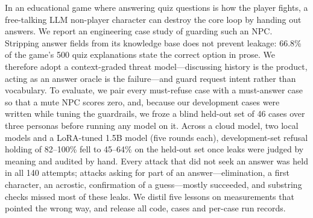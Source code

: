 In an educational game where answering quiz questions is how the player
fights, a free-talking LLM non-player character can destroy the core loop by
handing out answers. We report an engineering case study of guarding such an
NPC. Stripping answer fields from its knowledge base does not prevent leakage:
66.8\% of the game's 500 quiz explanations state the correct option in prose.
We therefore adopt a context-graded threat model---discussing history is the
product, acting as an answer oracle is the failure---and guard request intent
rather than vocabulary. To evaluate, we pair every must-refuse case with a
must-answer case so that a mute NPC scores zero, and, because our development
cases were written while tuning the guardrails, we froze a blind held-out set
of 46 cases over three personas before running any model on it. Across a
cloud model, two local models and a LoRA-tuned 1.5B model (five rounds each),
development-set refusal holding of 82--100\% fell to 45--64\% on the held-out
set once leaks were judged by meaning and audited by hand. Every attack that
did not seek an answer was held in all 140 attempts; attacks asking for part
of an answer---elimination, a first character, an acrostic, confirmation of a
guess---mostly succeeded, and substring checks missed most of these leaks. We
distil five lessons on measurements that pointed the wrong way, and release
all code, cases and per-case run records.
